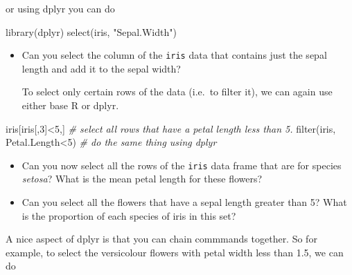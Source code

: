 \documentclass[
]{book}
\newenvironment{Shaded}{\begin{snugshade}}{\end{snugshade}}
\newcommand{\CommentTok}[1]{\textcolor[rgb]{0.56,0.35,0.01}{\textit{#1}}}
\newcommand{\DecValTok}[1]{\textcolor[rgb]{0.00,0.00,0.81}{#1}}
\newcommand{\FunctionTok}[1]{\textcolor[rgb]{0.00,0.00,0.00}{#1}}
\newcommand{\NormalTok}[1]{#1}
\newcommand{\SpecialCharTok}[1]{\textcolor[rgb]{0.00,0.00,0.00}{#1}}
\newcommand{\StringTok}[1]{\textcolor[rgb]{0.31,0.60,0.02}{#1}}
\theoremstyle{definition}
\theoremstyle{definition}
\theoremstyle{definition}
\theoremstyle{definition}
\theoremstyle{remark}
\begin{document}
\begin{Shaded}
\end{Shaded}

or using dplyr you can do

\begin{Shaded}
\begin{Highlighting}[]
\FunctionTok{library}\NormalTok{(dplyr)}
\FunctionTok{select}\NormalTok{(iris, }\StringTok{"Sepal.Width"}\NormalTok{)}
\end{Highlighting}
\end{Shaded}

\begin{itemize}
\item
  Can you select the column of the \texttt{iris} data that contains just the sepal length and add it to the sepal width?

  To select only certain rows of the data (i.e.~to filter it), we can again use either base R or dplyr.
\end{itemize}

\begin{Shaded}
\begin{Highlighting}[]
\NormalTok{iris[iris[,}\DecValTok{3}\NormalTok{]}\SpecialCharTok{\textless{}}\DecValTok{5}\NormalTok{,] }
\CommentTok{\# select all rows that have a petal length less than 5.}
\FunctionTok{filter}\NormalTok{(iris, Petal.Length}\SpecialCharTok{\textless{}}\DecValTok{5}\NormalTok{) }\CommentTok{\# do the same thing using dplyr}
\end{Highlighting}
\end{Shaded}

\begin{itemize}
\item
  Can you now select all the rows of the \texttt{iris} data frame that are for species \emph{setosa}? What is the mean petal length for these flowers?
\item
  Can you select all the flowers that have a sepal length greater than 5? What is the proportion of each species of iris in this set?
\end{itemize}

A nice aspect of dplyr is that you can chain commmands together. So for example, to select the versicolour flowers with petal width less than 1.5, we can do
\end{document}
